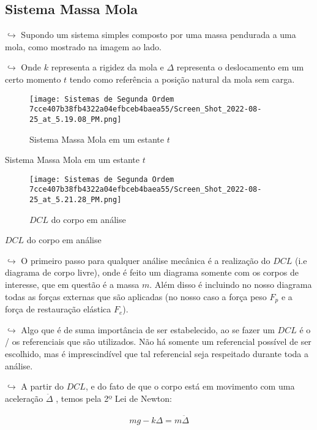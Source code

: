 \documentclass[]{article}
\begin{document}
  \hypertarget{sistema-massa-mola}{%
  \subsection{Sistema Massa Mola}\label{sistema-massa-mola}}

  \(\hookrightarrow\) Supondo um sistema simples composto por uma massa
  pendurada a uma mola, como mostrado na imagem ao lado.

  \(\hookrightarrow\) Onde \(k\) representa a rigidez da mola e \(\Delta\)
  representa o deslocamento em um certo momento \(t\) tendo como
  referência a posição natural da mola sem carga.

  \begin{figure}
  \centering
  \texttt{[image: Sistemas de Segunda Ordem 7cce407b38fb4322a04efbceb4baea55/Screen\_Shot\_2022-08-25\_at\_5.19.08\_PM.png]}
  \caption{Sistema Massa Mola em um estante \(t\)}
  \end{figure}

  Sistema Massa Mola em um estante \(t\)

  \begin{figure}
  \centering
  \texttt{[image: Sistemas de Segunda Ordem 7cce407b38fb4322a04efbceb4baea55/Screen\_Shot\_2022-08-25\_at\_5.21.28\_PM.png]}
  \caption{\(DCL\) do corpo em análise}
  \end{figure}

  \(DCL\) do corpo em análise

  \(\hookrightarrow\) O primeiro passo para qualquer análise mecânica é a
  realização do \(DCL\) (i.e diagrama de corpo livre), onde é feito um
  diagrama somente com os corpos de interesse, que em questão é a massa
  \(m\). Além disso é incluindo no nosso diagrama todas as forças externas
  que são aplicadas (no nosso caso a força peso \(F_p\) e a força de
  restauração elástica \(F_e\)).

  \(\hookrightarrow\) Algo que é de suma importância de ser estabelecido,
  ao se fazer um \(DCL\) é o / os referenciais que são utilizados. Não há
  somente um referencial possível de ser escolhido, mas é imprescindível
  que tal referencial seja respeitado durante toda a análise.

  \(\hookrightarrow\) A partir do \(DCL\), e do fato de que o corpo está
  em movimento com uma aceleração \(\ddot\Delta\) , temos pela 2º Lei de
  Newton:

  \[
  \begin{align}
  mg - k\Delta = m\ddot\Delta
  \end{align}
  \]
\end{document}
